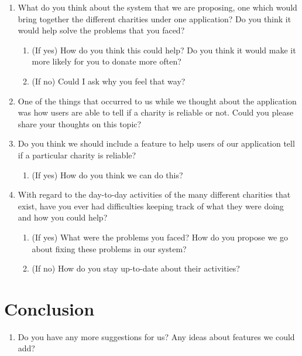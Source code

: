 \documentclass[11pt]{article}
\begin{document}
    \begin{enumerate}
    
        \item What do you think about the system that we are proposing, one which would bring together the different charities under one application? Do you think it would help solve the problems that you faced?
        
        \begin{enumerate}[label=(\alph*)]
            \item (If yes) How do you think this could help? Do you think it would make it more likely for you to donate more often?
            \item (If no) Could I ask why you feel that way?
        \end{enumerate}
        
        \item One of the things that occurred to us while we thought about the application was how users are able to tell if a charity is reliable or not. Could you please share your thoughts on this topic?
        
        \item Do you think we should include a feature to help users of our application tell if a particular charity is reliable?
        
        \begin{enumerate}[label=(\alph*)]
            \item (If yes) How do you think we can do this?
        \end{enumerate}
        
        \item With regard to the day-to-day activities of the many different charities that exist, have you ever had difficulties keeping track of what they were doing and how you could help?
        
        \begin{enumerate}[label=(\alph*)]
            \item (If yes) What were the problems you faced? How do you propose we go about fixing these problems in our system?
            \item (If no) How do you stay up-to-date about their activities?
        \end{enumerate}
    
    \end{enumerate}
    
    \section {Conclusion}
    
    \begin{enumerate}
    
        \item Do you have any more suggestions for us? Any ideas about features we could add?
    
    \end{enumerate}
 
\end{document}
